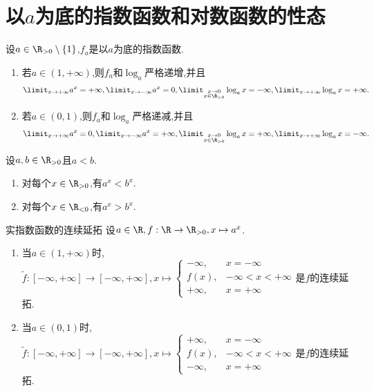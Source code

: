 \section{以\texorpdfstring{$a$}{a}为底的指数函数和对数函数的性态}

\begin{proposition}{}{}
	设$a\in\R_{>0}\setminus\left\{1\right\}$,$f_{a}$是以$a$为底的指数函数.
	\begin{enumerate}
		\item 若$a\in\left(1,+\infty\right)$,则$f_{a}$和$\log_{a}$严格递增,并且
		\begin{align*}
			\limit_{x\to+\infty}a^{x}=+\infty,\limit_{x\to-\infty}a^{x}=0,\limit_{\substack{x\to 0\\x\in\R_{>0}}}\log_{a}x=-\infty,\limit_{x\to+\infty}\log_{a}x=+\infty.
		\end{align*}
		\item 若$a\in\left(0,1\right)$,则$f_{a}$和$\log_{a}$严格递减,并且
		\begin{align*}
			\limit_{x\to+\infty}a^{x}=0,\limit_{x\to-\infty}a^{x}=+\infty,\limit_{\substack{x\to 0\\x\in\R_{>0}}}\log_{a}x=+\infty,\limit_{x\to+\infty}\log_{a}x=-\infty.
		\end{align*}
	\end{enumerate}
\end{proposition}

\begin{corollary}{}{}
	设$a,b\in\R_{>0}$且$a<b$.
	\begin{enumerate}
		\item 对每个$x\in\R_{>0}$,有$a^{x}<b^{x}$.
		\item 对每个$x\in\R_{<0}$,有$a^{x}>b^{x}$.
	\end{enumerate}
\end{corollary}

\begin{proposition}{实指数函数的连续延拓}{}
	设$a\in\R,f:\R\to\R_{>0},x\mapsto a^{x}$.
	\begin{enumerate}
		\item 当$a\in\left(1,+\infty\right)$时,$\tilde{f}:\left[-\infty,+\infty\right]\to\left[-\infty,+\infty\right],x\mapsto
		\begin{cases}
			-\infty,&x=-\infty\\
			f\left(x\right),&-\infty<x<+\infty\\
			+\infty,&x=+\infty
		\end{cases}$是$f$的连续延拓.
		\item 当$a\in\left(0,1\right)$时,$\tilde{f}:\left[-\infty,+\infty\right]\to\left[-\infty,+\infty\right],x\mapsto
		\begin{cases}
			+\infty,&x=-\infty\\
			f\left(x\right),&-\infty<x<+\infty\\
			-\infty,&x=+\infty
		\end{cases}$是$f$的连续延拓.
	\end{enumerate}
\end{proposition}

